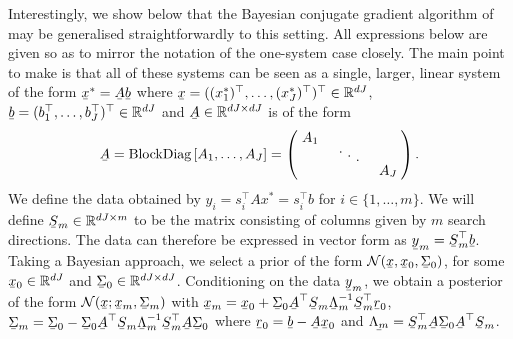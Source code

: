 \documentclass[twoside]{article}
\newcommand\barbelow[1]{\stackunder[1.2pt]{$#1$}{\rule{.8ex}{.075ex}}}
\newcommand{\diagentry}[1]{\mathmakebox[1.8em]{#1}}
\newcommand{\xddots}{%
  \raise 4pt \hbox {.}
  \mkern 6mu
  \raise 1pt \hbox {.}
  \mkern 6mu
  \raise -2pt \hbox {.}
}
\begin{document}
Interestingly, we show below that the Bayesian conjugate gradient algorithm of \cite{Cockayne2019} may be generalised straightforwardly to this setting. All expressions below are given so as to mirror the notation of the one-system case closely. The main point to make is that all of these systems can be seen as a single, larger, linear system of the form $\barbelow{x}^* = \barbelow{A} \barbelow{b}$ where $\barbelow{x} = ((x^*_1)^\top,\ldots,(x^*_J)^\top)^\top \in \mathbb{R}^{dJ}$, $\barbelow{b} = (b_1^\top,\ldots,b_J^\top)^\top \in \mathbb{R}^{dJ}$ and $\barbelow{A} \in \mathbb{R}^{dJ \times dJ}$ is of the form
\begin{align*}
	\barbelow{A} = \text{BlockDiag}\left[A_1,\ldots,A_J\right] = 
	\begin{pmatrix}
    \diagentry{A_1}\\
    &\diagentry{\xddots}\\
    &&\diagentry{A_J}\\
	\end{pmatrix}.
	\end{align*}
 We define the data obtained by $y_{i} = s_{i}^\top A x^* = s_{i}^\top b$ for $i \in \{1,\ldots,m\}$. We will define $\barbelow{S}_m \in \mathbb{R}^{dJ \times m}$ to be the matrix consisting of columns given by $m$ search directions. The data can therefore be expressed in vector form as $\barbelow{y}_m = \barbelow{S}_m^\top \barbelow{b}$. Taking a Bayesian approach, we select a prior of the form $\mathcal{N}(\barbelow{x},\barbelow{x}_0,\barbelow{\Sigma}_0)$, for some $\barbelow{x}_0 \in \mathbb{R}^{dJ}$ and $\barbelow{\Sigma}_0 \in \mathbb{R}^{dJ \times dJ}$. Conditioning on the data $\barbelow{y}_m$, we obtain a posterior of the form $\mathcal{N}(\barbelow{x} ; \barbelow{x}_m,\barbelow{\Sigma}_m)$ with $\barbelow{x}_m  = \barbelow{x}_0 + \barbelow{\Sigma}_0 \barbelow{A}^\top \barbelow{S}_m \barbelow{\Lambda}_m^{-1} \barbelow{S}_m^\top \barbelow{r}_0$, $\barbelow{\Sigma}_m  = \barbelow{\Sigma}_0 - \barbelow{\Sigma}_0 \barbelow{A}^\top \barbelow{S}_m \barbelow{\Lambda}_{m}^{-1} \barbelow{S}_m^\top \barbelow{A} \barbelow{\Sigma}_0$ where $\barbelow{r}_0 = \barbelow{b} - \barbelow{A} \barbelow{x}_0$ and $\barbelow{\Lambda_m} = \barbelow{S}_m^\top \barbelow{A} \barbelow{\Sigma}_0 \barbelow{A}^\top \barbelow{S}_m$. 
\end{document}
